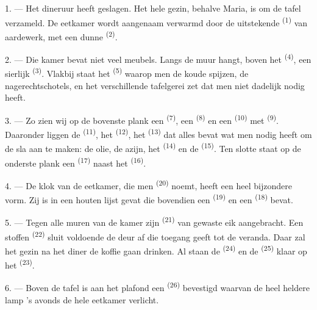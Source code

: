 1. --- Het dineruur heeft geslagen. Het hele gezin, behalve Maria, is om de tafel verzameld.
De eetkamer wordt aangenaam verwarmd door de uitstekende
 \textsuperscript{(1)} van aardewerk, met een dunne
 \textsuperscript{(2)}.

2. --- Die kamer bevat niet veel meubels. Langs de muur hangt, boven het
 \textsuperscript{(4)}, een sierlijk 
\textsuperscript{(3)}. Vlakbij staat het  \textsuperscript{(5)} waarop men de
koude spijzen, de nagerechtschotels, en het verschillende tafelgerei zet dat men niet dadelijk
nodig heeft.

3. --- Zo zien wij op de bovenste plank een  \textsuperscript{(7)}, een
 \textsuperscript{(8)} en een
 \textsuperscript{(10)} met 
\textsuperscript{(9)}. Daaronder liggen de  \textsuperscript{(11)}, het
 \textsuperscript{(12)}, het
 \textsuperscript{(13)} dat alles bevat wat men nodig
heeft om de sla aan te maken: de olie, de azijn, het  \textsuperscript{(14)} en
de  \textsuperscript{(15)}. Ten slotte staat op de onderste plank een
 \textsuperscript{(17)} naast het
 \textsuperscript{(16)}.

4. --- De klok van de eetkamer, die men  \textsuperscript{(20)} noemt, heeft
een heel bijzondere vorm. Zij is in een houten lijst gevat die bovendien een
 \textsuperscript{(19)} en een  \textsuperscript{(18)}
bevat.

\VUsaut{4.6mm}
\VUsaut{3.0mm}

5. --- Tegen alle muren van de kamer zijn  \textsuperscript{(21)} van
gewaste eik aangebracht. Een stoffen
 \textsuperscript{(22)} sluit voldoende de deur af die
toegang geeft tot de veranda. Daar zal het gezin na het diner de koffie gaan drinken. Al staan
de  \textsuperscript{(24)} en de
 \textsuperscript{(25)} klaar op het 
\textsuperscript{(23)}.

6. --- Boven de tafel is aan het plafond een  \textsuperscript{(26)}
bevestigd waarvan de heel heldere lamp 's avonds de hele eetkamer verlicht.

